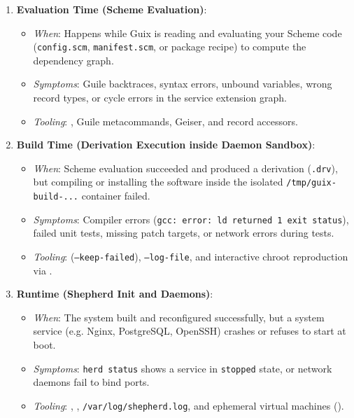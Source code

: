 \begin{enumerate}
  \item \textbf{Evaluation Time (Scheme Evaluation)}:
    \begin{itemize}
      \item \textit{When}: Happens while Guix is reading and evaluating your Scheme code (\texttt{config.scm}, \texttt{manifest.scm}, or package recipe) to compute the dependency graph.
      \item \textit{Symptoms}: Guile backtraces, syntax errors, unbound variables, wrong record types, or cycle errors in the service extension graph.
      \item \textit{Tooling}: , Guile metacommands, Geiser, and record accessors.
    \end{itemize}

  \item \textbf{Build Time (Derivation Execution inside Daemon Sandbox)}:
    \begin{itemize}
      \item \textit{When}: Scheme evaluation succeeded and produced a derivation (\texttt{.drv}), but compiling or installing the software inside the isolated \texttt{/tmp/guix-build-...} container failed.
      \item \textit{Symptoms}: Compiler errors (\texttt{gcc: error: ld returned 1 exit status}), failed unit tests, missing patch targets, or network errors during tests.
      \item \textit{Tooling}:  (\texttt{--keep-failed}), \texttt{--log-file}, and interactive chroot reproduction via .
    \end{itemize}

  \item \textbf{Runtime (Shepherd Init and Daemons)}:
    \begin{itemize}
      \item \textit{When}: The system built and reconfigured successfully, but a system service (e.g. Nginx, PostgreSQL, OpenSSH) crashes or refuses to start at boot.
      \item \textit{Symptoms}: \texttt{herd status} shows a service in \texttt{stopped} state, or network daemons fail to bind ports.
      \item \textit{Tooling}: , , \texttt{/var/log/shepherd.log}, and ephemeral virtual machines ().
    \end{itemize}
\end{enumerate}

